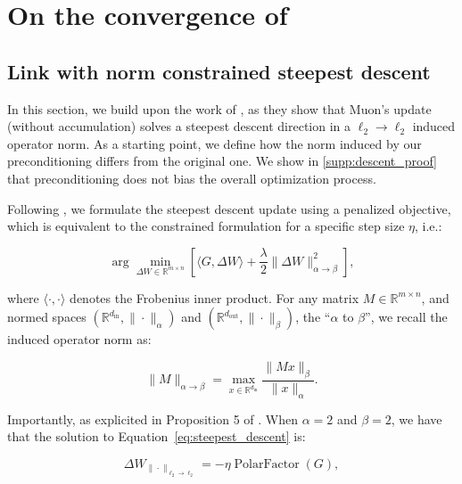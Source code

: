 \section{On the convergence of \turbomuon}
\subsection{Link with norm  constrained steepest descent}
\label{ap:proof_convergence}
    In this section, we build upon the work of \citet{bernstein2024oldoptimizernewnorm}, as they show that Muon's update (without accumulation) solves a steepest descent direction in a $\ell_2 \rightarrow \ell_2$ induced operator norm.
    As a starting point, we define how the norm induced by our preconditioning differs from the original one. We show in \cref{supp:descent_proof}
    that preconditioning does not bias the overall optimization process.
    
    \hfill
    
    Following \cite{bernstein2024oldoptimizernewnorm}, we formulate the steepest descent update using a penalized objective, which is equivalent to the constrained formulation for a specific step size $\eta$, i.e.:
    
    \begin{equation}
        \arg \min_{\Delta W \in \mathbb{R}^{m \times n}} \left[ \langle G, \Delta W \rangle + \frac{\lambda}{2} \| \Delta W\|_{\alpha \rightarrow \beta}^2 \right],
    \label{eq:steepest_descent}
    \end{equation}
    
    \noindent where $\langle \cdot , \cdot \rangle$ denotes the Frobenius inner product. For any matrix $M \in \mathbb{R}^{m \times n}$, and normed spaces $(\mathbb{R}^{d_\mathrm{in}}, \| \cdot \|_\alpha)$ and $(\mathbb{R}^{d_\mathrm{out}}, \| \cdot \|_\beta)$, the ``$\alpha$ to $\beta$'', we recall the induced operator norm as:
    
    \begin{equation}
        \| M \|_{\alpha \rightarrow \beta} = \max_{x \in \mathbb{R}^{d_\mathrm{in}}} \frac{\| M x \|_\beta}{\| x \|_\alpha}.
    \end{equation}
    
    \noindent Importantly, as explicited in Proposition 5 of \cite{bernstein2024oldoptimizernewnorm}. When $\alpha = 2$ and $\beta = 2$, we have that the solution to Equation~\ref{eq:steepest_descent} is:
    
    
    \begin{equation*}
        \Delta W_{\| \cdot \|_{\ell_2 \rightarrow \ell_2}} = -\eta \operatorname{PolarFactor}(G),
    \end{equation*}
    
